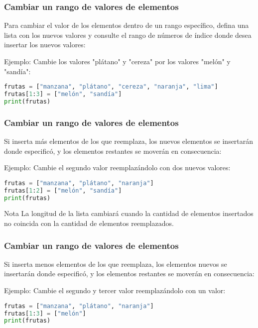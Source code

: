 \begin{frame}[fragile]
  \frametitle{Cambiar un rango de valores de elementos}

  Para cambiar el valor de los elementos dentro de un rango
  específico, defina una lista con los nuevos valores y consulte el
  rango de números de índice donde desea insertar los nuevos valores:

  \vspace{\baselineskip}
  Ejemplo: Cambie los valores "plátano" y "cereza" por los valores "melón" y "sandía":
  \begin{lstlisting}[language=Python]
frutas = ["manzana", "plátano", "cereza", "naranja", "lima"]
frutas[1:3] = ["melón", "sandía"]
print(frutas)
  \end{lstlisting}
\end{frame}

\begin{frame}[fragile]
  \frametitle{Cambiar un rango de valores de elementos}

  Si inserta más elementos de los que reemplaza, los nuevos elementos
  se insertarán donde especificó, y los elementos restantes se moverán
  en consecuencia:

  \vspace{\baselineskip}
  Ejemplo: Cambie el segundo valor reemplazándolo con dos nuevos valores:
  \begin{lstlisting}[language=Python]
frutas = ["manzana", "plátano", "naranja"]
frutas[1:2] = ["melón", "sandía"]
print(frutas)
  \end{lstlisting}

  \vspace{\baselineskip}
  \begin{exampleblock}{Nota}
    La longitud de la lista cambiará cuando la cantidad de elementos
    insertados no coincida con la cantidad de elementos reemplazados.
  \end{exampleblock}{}
\end{frame}

\begin{frame}[fragile]
  \frametitle{Cambiar un rango de valores de elementos}

  Si inserta menos elementos de los que reemplaza, los elementos
  nuevos se insertarán donde especificó, y los elementos restantes
  se moverán en consecuencia:

  \vspace{\baselineskip}
  Ejemplo: Cambie el segundo y tercer valor reemplazándolo con un valor:
  \begin{lstlisting}[language=Python]
frutas = ["manzana", "plátano", "naranja"]
frutas[1:3] = ["melón"]
print(frutas)
  \end{lstlisting}
\end{frame}

